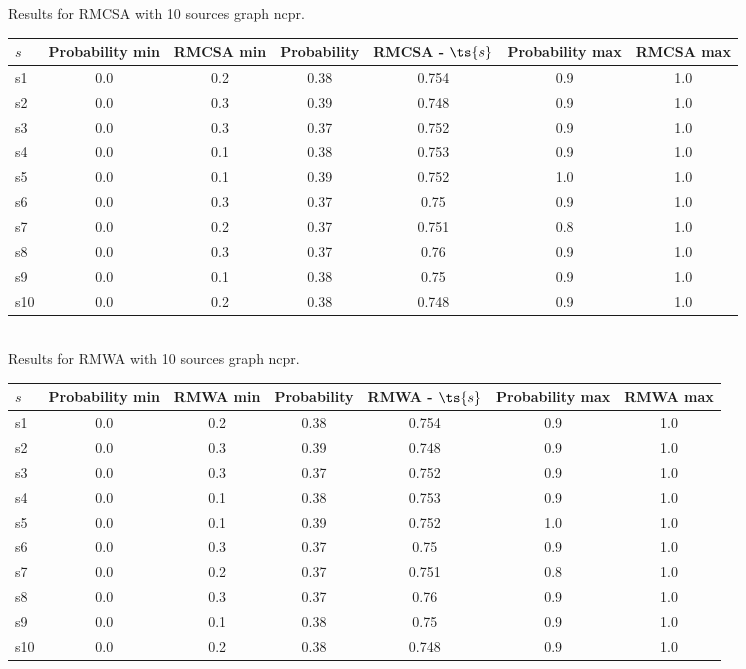 \documentclass{article}
\begin{document}
\noindent Results for RMCSA with 10 sources graph ncpr.

\noindent\begin{tabular}{|l|c|c|c|c|c|c|}
\hline
$s$& Probability min & RMCSA min & Probability & RMCSA - $\ts{s}$ & Probability max & RMCSA max\\
\hline
s1 &0.0 & 0.2 & 0.38 & 0.754 & 0.9 & 1.0\\
\hline
s2 &0.0 & 0.3 & 0.39 & 0.748 & 0.9 & 1.0\\
\hline
s3 &0.0 & 0.3 & 0.37 & 0.752 & 0.9 & 1.0\\
\hline
s4 &0.0 & 0.1 & 0.38 & 0.753 & 0.9 & 1.0\\
\hline
s5 &0.0 & 0.1 & 0.39 & 0.752 & 1.0 & 1.0\\
\hline
s6 &0.0 & 0.3 & 0.37 & 0.75 & 0.9 & 1.0\\
\hline
s7 &0.0 & 0.2 & 0.37 & 0.751 & 0.8 & 1.0\\
\hline
s8 &0.0 & 0.3 & 0.37 & 0.76 & 0.9 & 1.0\\
\hline
s9 &0.0 & 0.1 & 0.38 & 0.75 & 0.9 & 1.0\\
\hline
s10 &0.0 & 0.2 & 0.38 & 0.748 & 0.9 & 1.0\\
\hline
\end{tabular}\\

\noindent Results for RMWA with 10 sources graph ncpr.

\noindent\begin{tabular}{|l|c|c|c|c|c|c|}
\hline
$s$& Probability min & RMWA min & Probability & RMWA - $\ts{s}$ & Probability max & RMWA max\\
\hline
s1 &0.0 & 0.2 & 0.38 & 0.754 & 0.9 & 1.0\\
\hline
s2 &0.0 & 0.3 & 0.39 & 0.748 & 0.9 & 1.0\\
\hline
s3 &0.0 & 0.3 & 0.37 & 0.752 & 0.9 & 1.0\\
\hline
s4 &0.0 & 0.1 & 0.38 & 0.753 & 0.9 & 1.0\\
\hline
s5 &0.0 & 0.1 & 0.39 & 0.752 & 1.0 & 1.0\\
\hline
s6 &0.0 & 0.3 & 0.37 & 0.75 & 0.9 & 1.0\\
\hline
s7 &0.0 & 0.2 & 0.37 & 0.751 & 0.8 & 1.0\\
\hline
s8 &0.0 & 0.3 & 0.37 & 0.76 & 0.9 & 1.0\\
\hline
s9 &0.0 & 0.1 & 0.38 & 0.75 & 0.9 & 1.0\\
\hline
s10 &0.0 & 0.2 & 0.38 & 0.748 & 0.9 & 1.0\\
\hline
\end{tabular}\\
\end{document}

